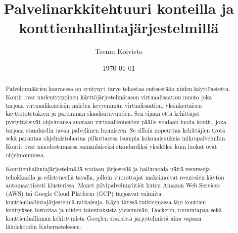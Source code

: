 \documentclass[finnish,gradu]{tktltiki3}
\begin{document}
    \singlespacing
    
    \title{Palvelinarkkitehtuuri konteilla ja konttienhallintajärjestelmillä}
    \author{Teemu Koivisto}
    \date{\today}
    
    \maketitle
    
    
    
    
    
    \begin{abstract}
    
    Palvelinmäärien kasvaessa on syntynyt tarve tehostaa entisestään niiden käyttöastetta. Kontit ovat uudentyyppinen käyttöjärjestelmätason virtuaalisaation muoto joka tarjoaa virtuaalikoneisiin nähden kevyemmän virtualisaation, yksinkertaisen käyttötotetuksen ja paremman skaalautuvuuden. Sen sijaan että kehittäjät pystyttäisivät ohjelmansa suoraan virtuaalikoneiden päälle voidaan luoda kontti, joka tarjoaa standardin tavan palvelimen luomiseen. Se silloin nopeuttaa kehittäjien työtä sekä parantaa ohjelmistolaatua pilkottaessa isompia kokonaisuuksia mikropalveluihin. Kontit ovat muodostumassa samanlaiseksi standardiksi yksiköksi kuin luokat ovat ohjelmoinnissa.
    
    Konttienhallintajärjestelmällä voidaan järjestellä ja hallinnoida näitä resursseja tehokkaalla ja edistyneellä tavalla, jolloin vuorottajat maksimoivat resurssien käytön automaattisesti klusterissa. Monet pilvipalvelunyhtiöt kuten Amazon Web Services (AWS) tai Google Cloud Platform (GCP) tarjoavat valmiita konttienhallintajärjestelmä-ratkaisuja. Käyn täyssä tutkielmassa läpi konttien kehityksen historiaa ja niiden toteutuksista yleisimmän, Dockerin, toimintapaa sekä konttienhallinnan kehittymistä Googlen sisäisistä järjestelmistä aina vapaan lähdekoodin Kubernetekseen.
    
    \end{abstract}
    
    \mytableofcontents
    
\end{document}
